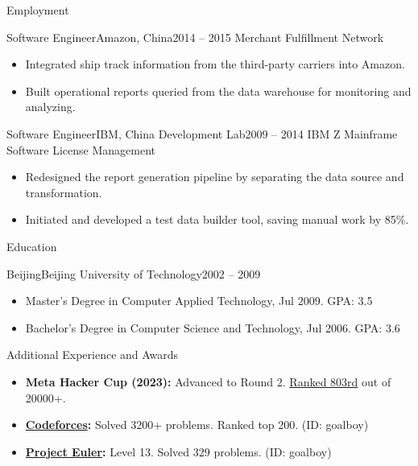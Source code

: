 \documentclass[]{mcdowellcv}
\begin{document}
\begin{cvsection}{Employment}
		\begin{cvsubsection}{Software Engineer}{Amazon, China}{2014 – 2015}
			Merchant Fulfillment Network
			\begin{itemize}
				\item Integrated ship track information from the third-party carriers into Amazon.
				\item Built operational reports queried from the data warehouse for monitoring and analyzing.
			\end{itemize}
		\end{cvsubsection}
		
		\begin{cvsubsection}{Software Engineer}{IBM, China Development Lab}{2009 – 2014}
			IBM Z Mainframe Software License Management
			\begin{itemize}
				\item Redesigned the report generation pipeline by separating the data source and transformation.
				\item Initiated and developed a test data builder tool, saving manual work by 85\%.
			\end{itemize}
		\end{cvsubsection}
	\end{cvsection}
	
	\begin{cvsection}{Education}
		\begin{cvsubsection}{Beijing}{Beijing University of Technology}{2002 – 2009}
			\begin{itemize}
				\item Master's Degree in Computer Applied Technology, Jul 2009. GPA: 3.5
				\item Bachelor's Degree in Computer Science and Technology, Jul 2006. GPA: 3.6
			\end{itemize}
		\end{cvsubsection}
	\end{cvsection}
	
	\begin{cvsection}{Additional Experience and Awards}
		\begin{cvsubsection}{}{}{}
			\begin{itemize}
				\item \textbf{Meta Hacker Cup (2023):} Advanced to Round 2. {\href{https://charles-wangkai.github.io/certificates/certificate_meta_hacker_cup_2023.png}{Ranked 803rd}} out of 20000+.
				\item \textbf{\href{https://codeforces.com}{Codeforces}:} Solved 3200+ problems. Ranked top 200. (ID: goalboy)
				\item \textbf{\href{https://projecteuler.net}{Project Euler}:} Level 13. Solved 329 problems. (ID: goalboy)
			\end{itemize}
		\end{cvsubsection}
	\end{cvsection}
	
\end{document}
